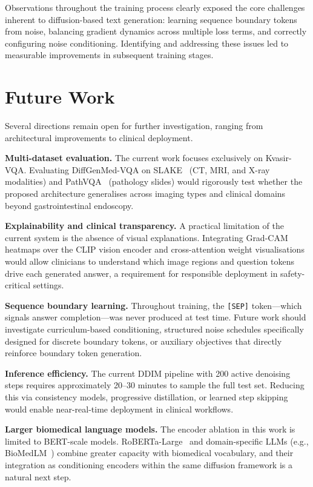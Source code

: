 \documentclass[9pt]{report}
\begin{document}
Observations throughout the training process clearly exposed the core challenges inherent to diffusion-based text generation: learning sequence boundary tokens from noise, balancing gradient dynamics across multiple loss terms, and correctly configuring noise conditioning. Identifying and addressing these issues led to measurable improvements in subsequent training stages.

\section{Future Work}

Several directions remain open for further investigation, ranging from architectural improvements to clinical deployment.

\textbf{Multi-dataset evaluation.} The current work focuses exclusively on Kvasir-VQA. Evaluating DiffGenMed-VQA on SLAKE~\cite{slake} (CT, MRI, and X-ray modalities) and PathVQA~\cite{he2020pathvqa} (pathology slides) would rigorously test whether the proposed architecture generalises across imaging types and clinical domains beyond gastrointestinal endoscopy.

\textbf{Explainability and clinical transparency.} A practical limitation of the current system is the absence of visual explanations. Integrating Grad-CAM~\cite{gradcam} heatmaps over the CLIP vision encoder and cross-attention weight visualisations would allow clinicians to understand which image regions and question tokens drive each generated answer, a requirement for responsible deployment in safety-critical settings.

\textbf{Sequence boundary learning.} Throughout training, the \texttt{[SEP]} token---which signals answer completion---was never produced at test time. Future work should investigate curriculum-based conditioning, structured noise schedules specifically designed for discrete boundary tokens, or auxiliary objectives that directly reinforce boundary token generation.

\textbf{Inference efficiency.} The current DDIM pipeline with 200 active denoising steps requires approximately 20--30 minutes to sample the full test set. Reducing this via consistency models, progressive distillation, or learned step skipping would enable near-real-time deployment in clinical workflows.

\textbf{Larger biomedical language models.} The encoder ablation in this work is limited to BERT-scale models. RoBERTa-Large~\cite{roberta} and domain-specific LLMs (e.g., BioMedLM~\cite{biomedlm}) combine greater capacity with biomedical vocabulary, and their integration as conditioning encoders within the same diffusion framework is a natural next step.
\end{document}
